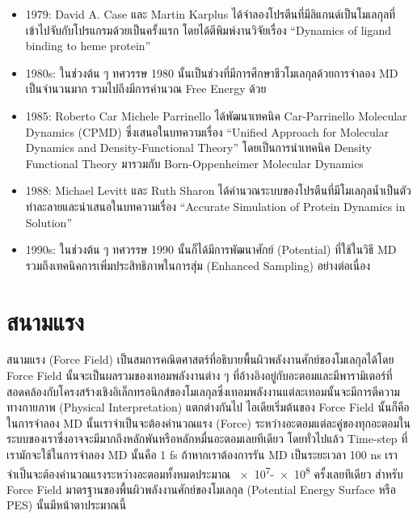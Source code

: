 \begin{itemize}[topsep=0pt,noitemsep]
  \item 1979: David A. Case และ Martin Karplus ได้จำลองโปรตีนที่มีลิแกนด์เป็นโมเลกุลที่เข้าไปจับกับโปรแกรมด้วยเป็นครั้งแรก โดยได้ตีพิมพ์งานวิจัยเรื่อง \enquote{Dynamics of ligand binding to heme protein}\autocite{case1979}

  \item 1980s: ในช่วงต้น ๆ ทศวรรษ 1980 นั้นเป็นช่วงที่มีการศึกษาชีวโมเลกุลด้วยการจำลอง MD เป็นจำนวนมาก รวมไปถึงมีการคำนวณ Free Energy ด้วย

  \item 1985: Roberto Car Michele Parrinello ได้พัฒนาเทคนิค Car-Parrinello Molecular Dynamics (CPMD) ซึ่งเสนอในบทความเรื่อง \enquote{Unified Approach for Molecular Dynamics and Density-Functional Theory}\autocite{car1985} โดยเป็นการนำเทคนิค Density Functional Theory มารวมกับ Born-Oppenheimer Molecular Dynamics

  \item 1988: Michael Levitt และ Ruth Sharon ได้คำนวณระบบของโปรตีนที่มีโมเลกุลน้ำเป็นตัวทำละลายและนำเสนอในบทความเรื่อง \enquote{Accurate Simulation of Protein Dynamics in Solution}\autocite{levitt1988}

  \item 1990s: ในช่วงต้น ๆ ทศวรรษ 1990 นั้นก็ได้มีการพัฒนาศักย์ (Potential) ที่ใช้ในวิธี MD รวมถึงเทคนิคการเพิ่มประสิทธิภาพในการสุ่ม (Enhanced Sampling) อย่างต่อเนื่อง
\end{itemize}

\section{สนามแรง}

สนามแรง (Force Field) เป็นสมการคณิตศาสตร์ที่อธิบายพื้นผิวพลังงานศักย์ของโมเลกุลได้โดย Force Field นั้นจะเป็นผลรวมของเทอมพลังงานต่าง ๆ ที่อ้างอิงอยู่กับอะตอมและมีพารามิเตอร์ที่สอดคล้องกับโครงสร้างเชิงอิเล็กทรอนิกส์ของโมเลกุลซึ่งเทอมพลังงานแต่ละเทอมนั้นจะมีการตีความทางกายภาพ (Physical Interpretation) แตกต่างกันไป ไอเดียเริ่มต้นของ Force Field นั้นก็คือในการจำลอง MD นั้นเราจำเป็นจะต้องคำนวณแรง (Force) ระหว่างอะตอมแต่ละคู่ของทุกอะตอมในระบบของเราซึ่งอาจจะมีมากถึงหลักพันหรือหลักหมื่นอะตอมเลยทีเดียว โดยทั่วไปแล้ว Time-step ที่เรามักจะใช้ในการจำลอง MD นั้นคือ 1 fs ถ้าหากเราต้องการรัน MD เป็นระยะเวลา 100 ns เราจำเป็นจะต้องคำนวณแรงระหว่างอะตอมทั้งหมดประมาณ \num{e7}-\num{e8} ครั้งเลยทีเดียว สำหรับ Force Field มาตรฐานของพื้นผิวพลังงานศักย์ของโมเลกุล (Potential Energy Surface หรือ PES) นั้นมีหน้าตาประมาณนี้

